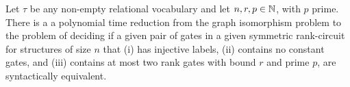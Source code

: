 \documentclass[../paper.tex]{subfiles}
\begin{document}

\begin{prop}
  Let $\tau$ be any non-empty relational vocabulary and let $n, r, p \in \mathbb{N}$,
  with $p$ prime. There is a a polynomial time reduction from the graph
  isomorphism problem to the problem of deciding if a given pair of gates in a
  given symmetric rank-circuit for structures of size $n$ that (i) has injective
  labels, (ii) contains no constant gates, and (iii) contains at most two rank
  gates with bound $r$ and prime $p$, are syntactically equivalent.
  \label{prop:syntactic-graph-iso}
\end{prop}
\end{document}
